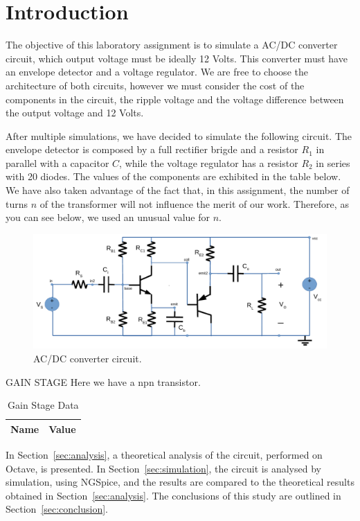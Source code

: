 \section{Introduction}
\label{sec:introduction}
The objective of this laboratory assignment is to simulate a AC/DC converter circuit, which output voltage must be ideally 12 Volts. 
This converter must have an envelope detector and a voltage regulator. We are free to choose the architecture of both circuits, 
however we must consider the cost of the components in the circuit, the ripple voltage and the voltage difference between the output 
voltage and 12 Volts.

After multiple simulations, we have decided to simulate the following circuit. The envelope detector is composed by
a full rectifier brigde and a resistor $R_1$ in parallel with a capacitor $C$, while the voltage regulator has a resistor $R_2$ in
series with 20 diodes. The values of the components are exhibited in the table below. We have also taken advantage of the fact that,
in this assignment, the number of turns $n$ of the transformer will not influence the merit of our work. Therefore, as you can see below,
we used an unusual value for $n$.

\begin{figure}[H] \centering
\includegraphics[width=0.8\linewidth]{circuit.pdf}
\caption{AC/DC converter circuit.}                                     
\label{fig:circuit}
\end{figure}

GAIN STAGE
Here we have a npn transistor.

\begin{table}[H]
  \centering
  \begin{tabular}{|l|r|}
     \hline    
    {\bf Name} & {\bf Value} \\ \hline   
    
  \end{tabular}
  \caption{Gain Stage Data}
  \label{tab:datags}
\end{table}


In Section~\ref{sec:analysis}, a theoretical analysis of the circuit, 
performed on Octave, is presented. In Section~\ref{sec:simulation}, the 
circuit is analysed by simulation, using NGSpice, and the results are compared to 
the theoretical results obtained in Section~\ref{sec:analysis}. The conclusions 
of this study are outlined in Section~\ref{sec:conclusion}.


